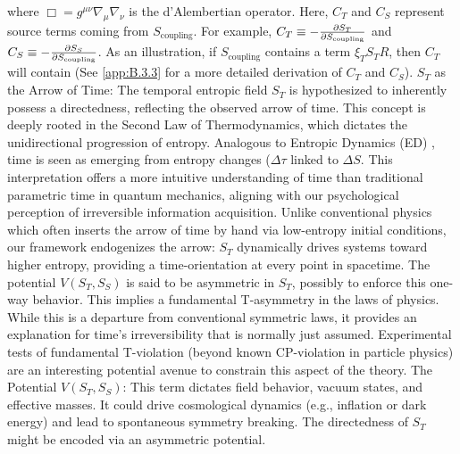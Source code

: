 \documentclass[11pt,a4paper]{article} %
\newcommand{\ST}{S_T}
\newcommand{\SSp}{S_S} %
\newcommand{\Scoupling}{S_{\text{coupling}}}
\begin{document}
where $\Box=g^{\mu\nu}\nabla_\mu\nabla_\nu$ is the d'Alembertian operator. Here, $C_T$ and $C_S$ represent source terms coming from $\Scoupling$. For example, $C_T\equiv-\pdv{\ST}{\Scoupling}$ and $C_S\equiv -\pdv{\SSp}{\Scoupling}$. As an illustration, if $\Scoupling$ contains a term $\xi_T\ST R$, then $C_T$ will contain (See \cref{app:B.3.3} for a more detailed derivation of $C_T$ and $C_S$). $\ST$ as the Arrow of Time: The temporal entropic field $\ST$ is hypothesized to inherently possess a directedness, reflecting the observed arrow of time. This concept is deeply rooted in the Second Law of Thermodynamics, which dictates the unidirectional progression of entropy. Analogous to Entropic Dynamics (ED) \cite{caticha2015}, time is seen as emerging from entropy changes ($\Delta\tau$ linked to $\Delta S$. This interpretation offers a more intuitive understanding of time than traditional parametric time in quantum mechanics, aligning with our psychological perception of irreversible information acquisition. Unlike conventional physics which often inserts the arrow of time by hand via low-entropy initial conditions, our framework endogenizes the arrow: $\ST$ dynamically drives systems toward higher entropy, providing a time-orientation at every point in spacetime. The potential $V(\ST,\SSp)$ is said to be asymmetric in $\ST$, possibly to enforce this one-way behavior. This implies a fundamental T-asymmetry in the laws of physics. While this is a departure from conventional symmetric laws, it provides an explanation for time's irreversibility that is normally just assumed. Experimental tests of fundamental T-violation (beyond known CP-violation in particle physics) are an interesting potential avenue to constrain this aspect of the theory. The Potential $V(\ST,\SSp)$: This term dictates field behavior, vacuum states, and effective masses. It could drive cosmological dynamics (e.g., inflation or dark energy) and lead to spontaneous symmetry breaking. The directedness of $\ST$ might be encoded via an asymmetric potential. 
\end{document}
